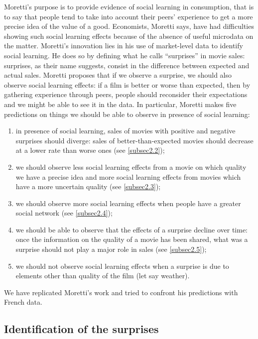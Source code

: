 Moretti's purpose is to provide evidence of social learning in consumption, that is to say that people tend to take into account their peers' experience to get a more precise idea of the value of a good. Economists, Moretti says, have had difficulties showing such social learning effects because of the absence of useful microdata on the matter. Moretti's innovation lies in his use of market-level data to identify social learning. He does so by defining what he calls ``surprises'' in movie sales: surprises, as their name suggests, consist in the difference between expected and actual sales. Moretti proposes that if we observe a surprise, we should also observe social learning effects: if a film is better or worse than expected, then by gathering experience through peers, people should reconsider their expectations and we might be able to see it in the data. In particular, Moretti makes five predictions on things we should be able to observe in presence of social learning: \begin{enumerate}
	\item in presence of social learning, sales of movies with positive and negative surprises should diverge: sales of better-than-expected movies should decrease at a lower rate than worse ones (see \ref{subsec2.2}); 
	\item we should observe less social learning effects from a movie on which quality we have a precise idea and more social learning effects from movies which have a more uncertain quality (see \ref{subsec2.3});
	\item we should observe more social learning effects when people have a greater social network (see \ref{subsec2.4});
	\item we should be able to observe that the effects of a surprise decline over time: once the information on the quality of a movie has been shared, what was a surprise should not play a major role in sales (see \ref{subsec2.5});
	\item we should not observe social learning effects when a surprise is due to elements other than quality of the film (let say weather).
\end{enumerate}
We have replicated Moretti's work and tried to confront his predictions with French data.
\subsection{Identification of the surprises}\label{subsec2.1}

